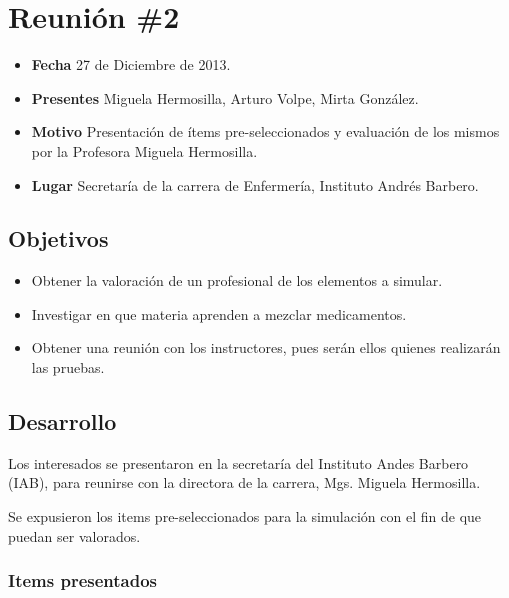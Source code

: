 \section{Reunión \#2}\label{reuniuxf3n-2}

\begin{itemize}
\itemsep1pt\parskip0pt
\item
  \textbf{Fecha} 27 de Diciembre de 2013.
\item
  \textbf{Presentes} Miguela Hermosilla, Arturo Volpe, Mirta González.
\item
  \textbf{Motivo} Presentación de ítems pre-seleccionados y evaluación
  de los mismos por la Profesora Miguela Hermosilla.
\item
  \textbf{Lugar} Secretaría de la carrera de Enfermería, Instituto
  Andrés Barbero.
\end{itemize}

\subsection{Objetivos}\label{objetivos}

\begin{itemize}
\itemsep1pt\parskip0pt
\item
  Obtener la valoración de un profesional de los elementos a simular.
\item
  Investigar en que materia aprenden a mezclar medicamentos.
\item
  Obtener una reunión con los instructores, pues serán ellos quienes
  realizarán las pruebas.
\end{itemize}

\subsection{Desarrollo}\label{desarrollo}

Los interesados se presentaron en la secretaría del Instituto Andes
Barbero (IAB), para reunirse con la directora de la carrera, Mgs.
Miguela Hermosilla.

Se expusieron los items pre-seleccionados para la simulación con el fin
de que puedan ser valorados.

\subsubsection{Items presentados}\label{items-presentados}

